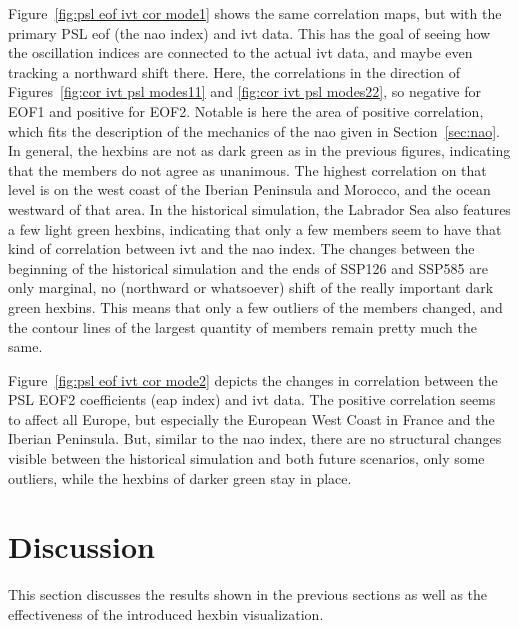 Figure~\ref{fig:psl eof ivt cor mode1} shows the same correlation maps, but with the primary PSL \ac{eof} (the \ac{nao} index) and \ac{ivt} data. 
This has the goal of seeing how the oscillation indices are connected to the actual \ac{ivt} data, and maybe even tracking a northward shift there. 
Here, the correlations in the direction of Figures~\ref{fig:cor ivt psl modes11} and \ref{fig:cor ivt psl modes22}, so negative for EOF1 and positive for EOF2.  
Notable is here the area of positive correlation, which fits the description of the mechanics of the \ac{nao} given in Section~\ref{sec:nao}. 
In general, the hexbins are not as dark green as in the previous figures, indicating that the members do not agree as unanimous. 
The highest correlation on that level is on the west coast of the Iberian Peninsula and Morocco, and the ocean westward of that area. 
In the historical simulation, the Labrador Sea also features a few light green hexbins, indicating that only a few members seem to have that kind of correlation between \ac{ivt} and the \ac{nao} index. 
The changes between the beginning of the historical simulation and the ends of SSP126 and SSP585 are only marginal, no (northward or whatsoever) shift of the really important dark green hexbins. 
This means that only a few outliers of the members changed, and the contour lines of the largest quantity of members remain pretty much the same. 



Figure~\ref{fig:psl eof ivt cor mode2} depicts the changes in correlation between the PSL EOF2 coefficients (\ac{eap} index) and \ac{ivt} data. 
The positive correlation seems to affect all Europe, but especially the European West Coast in France and the Iberian Peninsula. 
But, similar to the \ac{nao} index, there are no structural changes visible between the historical simulation and both future scenarios, only some outliers, while the hexbins of darker green stay in place.

\section{Discussion}
\label{sec:discussion}

This section discusses the results shown in the previous sections as well as the effectiveness of the introduced hexbin visualization. 

